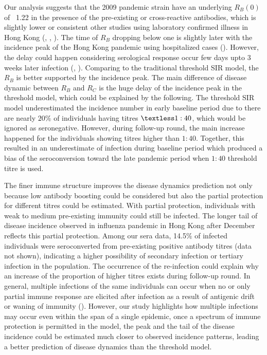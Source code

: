 \documentclass{article}
\begin{document}
Our analysis suggests that the 2009 pandemic strain have an underlying $R_{B}(0)$ of ~1.22 in the presence of the pre-existing or cross-reactive antibodies, which is slightly lower or consistent other studies using laboratory confirmed illness in Hong Kong (\cite{Cowling2010}, \cite{Wu2010}, \cite{Wu2014} \cite{Grund2011}). The time of $R_{B}$ dropping below one is slightly later with the incidence peak of the Hong Kong pandemic using hospitalized cases (\cite{Riley2011}). However, the delay could happen considering serological response occur few days upto 3 weeks later infection (\cite{Mak2010}, \cite{Miller2010}). Comparing to the traditional threshold SIR model, the $R_{B}$ is better supported by the incidence peak. The main difference of disease dynamic between $R_{B}$ and $R_{C}$ is the huge delay of the incidence peak in the threshold model, which could be explained by the following. The threshold SIR model underestimated the incidence number in early baseline period due to there are nearly $20\%$ of individuals having titres $\textless 1:40$, which  would be ignored as seronegative. However, during follow-up round, the main increase happened for the individuals showing titres higher than $1:40$. Together, this resulted in an underestimate of infection during baseline period which produced a bias of the seroconversion toward the late pandemic period when $1:40$ threshold titre is used. 
  
The finer immune structure improves the disease dynamics prediction not only because low antibody boosting could be considered but also the partial protection for different titres could be estimated. With partial protection, individuals with weak to medium pre-existing immunity could still be infected. The longer tail of disease incidence observed in influenza pandemic in Hong Kong after December reflects this partial protection. Among our sera data, 14.5$\%$ of infected individuals were seroconverted from pre-existing positive antibody titres (data not shown), indicating a higher possibility of secondary infection or tertiary infection in the population. The occurrence of the re-infection could explain why an increase of the proportion of higher titres exists during follow-up round. In general, multiple infections of the same individuals can occur when no or only partial immune response are elicited after infection as a result of antigenic drift or waning of immunity (\cite{Heesterbeek2015}). However, our study highlights how multiple infections may occur even within the span of a single epidemic, once a spectrum of immune protection is permitted in the model, the peak and the tail of the disease incidence could be estimated much closer to observed incidence patterns, leading a better prediction of disease dynamics than the threshold model.
\end{document}
